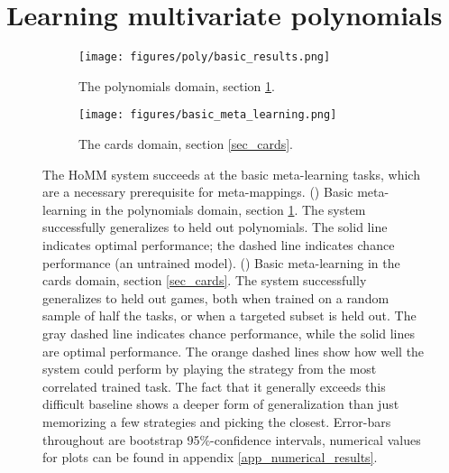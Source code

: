\documentclass{article}
\begin{document}
%
\section{Learning multivariate polynomials} \label{sec_poly}
\vspace{-0.5em} %
\begin{figure}
\centering
\begin{subfigure}[t]{0.5\textwidth}
\texttt{[image: figures/poly/basic\_results.png]}
\caption{The polynomials domain, section \ref{sec_poly}.}
\label{poly_basic_results}
\end{subfigure}%
\begin{subfigure}[t]{0.5\textwidth}
\texttt{[image: figures/basic\_meta\_learning.png]}
\caption{The cards domain, section \ref{sec_cards}.}
\label{cards_basic_results}
\end{subfigure}%
\caption{The HoMM system succeeds at the basic meta-learning tasks, which are a necessary prerequisite for meta-mappings. () Basic meta-learning in the polynomials domain, section \ref{sec_poly}. The system successfully generalizes to held out polynomials. The solid line indicates optimal performance; the dashed line indicates chance performance (an untrained model). () Basic meta-learning in the cards domain, section \ref{sec_cards}. The system successfully generalizes to held out games, both when trained on a random sample of half the tasks, or when a targeted subset is held out. The gray dashed line indicates chance performance, while the solid lines are optimal performance. The orange dashed lines show how well the system could perform by playing the strategy from the most correlated trained task. The fact that it generally exceeds this difficult baseline shows a deeper form of generalization than just memorizing a few strategies and picking the closest. Error-bars throughout are bootstrap 95\%-confidence intervals, numerical values for plots can be found in appendix \ref{app_numerical_results}.}
\end{figure}
\end{document}
